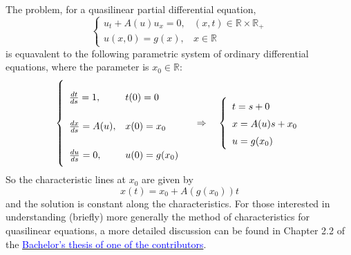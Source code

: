 \begin{remark}
    The problem, for a quasilinear partial differential equation,
    \[
        \left\{
        \begin{array}{ll}
            u_t + A(u) u_x = 0, & (x, t) \in \mathbb{R} \times \mathbb{R}_+ \\
            u(x, 0) = g(x),     & x \in \mathbb{R}
        \end{array}
        \right.
    \]
    is equavalent to the following parametric system of ordinary differential
    equations, where the parameter is \(x_0 \in \mathbb{R}\):
    \[
        \renewcommand{\arraystretch}{2.5}
        \left\{
        \begin{array}{ll}

            \frac{dt}{ds} = 1,    & t(0) = 0      \\
            \frac{dx}{ds} = A(u), & x(0) = x_0    \\
            \frac{du}{ds} = 0,    & u(0) = g(x_0)
        \end{array}
        \right.
        \quad \Rightarrow \quad
        \renewcommand{\arraystretch}{1.5}
        \left\{
        \begin{array}{l}
            t = s + 0       \\
            x = A(u)s + x_0 \\
            u = g(x_0)
        \end{array}
        \right.
    \]
    So the characteristic lines at \(x_0\) are given by \[x(t) = x_0 + A(g(x_0))t\] and the solution is constant along the characteristics. For those interested in
    understanding (briefly) more generally the method of characteristics for
    quasilinear equations, a more detailed discussion can be found in Chapter 2.2
    of the \href{https://github.com/alessandropedone/cauchy-kowalevski-theorem}
    {\textcolor{blue}{Bachelor's thesis of one of the contributors}}.
\end{remark}
